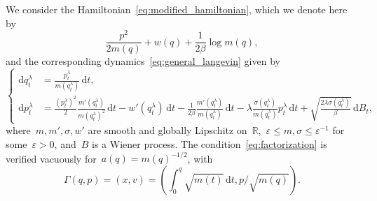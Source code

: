\documentclass[10pt]{article}
\renewcommand{\d}{\mathrm{d}}
\newcommand{\R}{\mathbb{R}}
\newcommand{\1}{\mathbbm 1}
\begin{document}
We consider the Hamiltonian~\eqref{eq:modified_hamiltonian}, which we denote here by
\begin{equation}
    \frac{p^2}{2m(q)} + w(q) + \frac1{2\beta}\log m(q),
\end{equation}
and the corresponding dynamics~\eqref{eq:general_langevin} given by
\begin{equation}
    \left\{\begin{aligned}
    \d q_t^\lambda &= \frac{p_t^\lambda}{m(q_t^\lambda)}\,\d t,\\
    \d p_t^\lambda &= \frac{(p_t^\lambda)^2}{2}\frac{m'(q_t^\lambda)}{m(q_t^\lambda)^2}\,\d t-w'(q_t^\lambda)\,\d t - \frac1{2\beta}\frac{m'(q_t^\lambda)}{m(q_t^\lambda)}\,\d t -\lambda \frac{\sigma(q_t^\lambda)}{m(q_t^\lambda)}p_t^\lambda\,\d t + \sqrt{\frac{2\lambda\sigma(q_t^\lambda)}{\beta}}\,\d B_t,
    \end{aligned}\right.
\end{equation}
where~$m,m',\sigma,w'$ are smooth and globally Lipschitz on~$\R$,~$\varepsilon\leq m,\sigma\leq \varepsilon^{-1}$ for some~$\varepsilon>0$, and~$B$ is a Wiener process.
The condition~\eqref{eq:factorization} is verified vacuously for~$a(q)=m(q)^{-1/2}$, with
\begin{equation}
    \label{eq:change_of_variables_1d}
    \Gamma(q,p) = (x,v) = \left(\int_0^q\sqrt{m(t)}\,\d t,p/\sqrt{m(q)}\right).
\end{equation}
\end{document}

